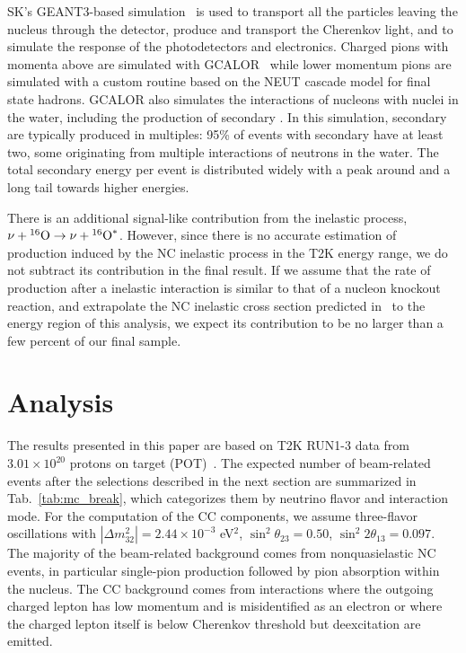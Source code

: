 \documentclass[
aps,
prd,
twocolumn,
superscriptaddress,
showpacs
]{revtex4-1}
\begin{document}
SK's GEANT3-based simulation~\cite{Brun:1994aa} is used to transport all the particles leaving the nucleus through the detector, produce and transport the Cherenkov light, and to simulate the response of the photodetectors and electronics. Charged pions with momenta above  are simulated with GCALOR~\cite{Zeitnitz:1994bs} while lower momentum pions are simulated with a custom routine based on the NEUT cascade model for final state hadrons.
GCALOR also simulates the interactions of nucleons with nuclei in the water, including the production of secondary \gmrs. 
In this simulation, secondary \gmrs are typically produced in multiples: 95\% of events with secondary \gmrs have at least two, some originating from multiple interactions of neutrons in the water. The total secondary \gmr energy per event is distributed widely with a peak around  and a long tail towards higher energies. 

There is an additional signal-like contribution from the inelastic process, $\nu + {}^{16}\textrm{O}\rightarrow \nu + {}^{16}\textrm{O}^*$. However, since there is no accurate estimation of \gmr production induced by the NC inelastic process in the T2K energy range, we do not subtract its contribution in the final result. If we assume that the rate of \gmr production after a inelastic interaction is similar to that of a nucleon knockout reaction, and extrapolate the NC inelastic cross section predicted in~\cite{Kolbe:2002gk} to the energy region of this analysis, we expect its contribution to be no larger than a few percent of our final sample.


\section{Analysis}

The results presented in this paper are based on T2K RUN1-3 data from $3.01 \times 10^{20}$ protons on target (POT)~\cite{Abe:2013fuq}. 
The expected number of beam-related events after the selections described in the next section are summarized in Tab.~\ref{tab:mc_break}, which categorizes them by neutrino flavor  and interaction mode. For the computation of the CC components, we assume three-flavor oscillations with $|\Delta m_{32}^{2}|=2.44 \times 10^{-3}$ eV$^{2}$, $\sin^{2} \theta_{23}=0.50$, $\sin^{2} 2\theta_{13}=0.097$. The majority of the beam-related background comes from nonquasielastic NC events, in particular single-pion production followed by pion absorption within the nucleus. The CC background comes from interactions where the outgoing charged lepton has low momentum and is misidentified as an electron or where the charged lepton itself is below Cherenkov threshold but deexcitation \gmrs are emitted.
\end{document}
